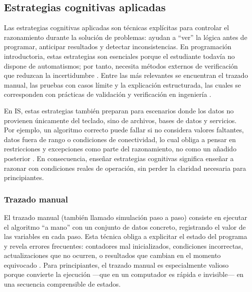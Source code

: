 \documentclass[12pt,twoside]{book}
\begin{document}
				\subsection{Estrategias cognitivas aplicadas}
					\noindent
					Las estrategias cognitivas aplicadas son técnicas explícitas para controlar el razonamiento durante la solución de problemas: ayudan a “ver” la lógica antes de programar, anticipar resultados y detectar inconsistencias. En programación introductoria, estas estrategias son esenciales porque el estudiante todavía no dispone de automatismos; por tanto, necesita métodos externos de verificación que reduzcan la incertidumbre \cite{Farrell2018Programming,Gaddis2022Starting}. Entre las más relevantes se encuentran el trazado manual, las pruebas con casos límite y la explicación estructurada, las cuales se corresponden con prácticas de validación y verificación en ingeniería \cite{Pressman2019Software,SWEBOK2025Guide}.
					
					En IS, estas estrategias también preparan para escenarios donde los datos no provienen únicamente del teclado, sino de archivos, bases de datos y servicios. Por ejemplo, un algoritmo correcto puede fallar si no considera valores faltantes, datos fuera de rango o condiciones de conectividad, lo cual obliga a pensar en restricciones y excepciones como parte del razonamiento, no como un añadido posterior \cite{Silberschatz2020Database,Elmasri2016Database,ISOIEC1998Information}. En consecuencia, enseñar estrategias cognitivas significa enseñar a razonar con condiciones reales de operación, sin perder la claridad necesaria para principiantes.
					
					\subsubsection{Trazado manual}
						\noindent
						El trazado manual (también llamado simulación paso a paso) consiste en ejecutar el algoritmo “a mano” con un conjunto de datos concreto, registrando el valor de las variables en cada paso. Esta técnica obliga a explicitar el estado del programa y revela errores frecuentes: contadores mal inicializados, condiciones incorrectas, actualizaciones que no ocurren, o resultados que cambian en el momento equivocado \cite{Farrell2018Programming,Gaddis2022Starting}. Para principiantes, el trazado manual es especialmente valioso porque convierte la ejecución —que en un computador es rápida e invisible— en una secuencia comprensible de estados.
						
\end{document}
